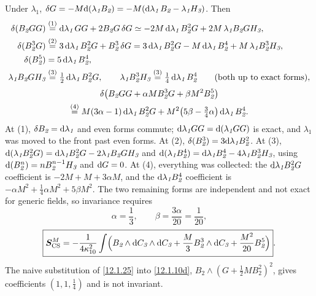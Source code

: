 \begin{tcolorbox}[breakable]
\begin{remark}
		Under $\lambda_{\textit{1}}$, $\delta G=-M\mathrm{d}(\lambda_{\textit{1}}B_{\textit{2}})=-M(\mathrm{d}\lambda_{\textit{1}}\,B_{\textit{2}}-\lambda_{\textit{1}}H_{\textit{3}})$. Then
		\begin{align*}
			\delta(B_{\textit{2}}GG)&\overset{(1)}{=} \mathrm{d}\lambda_{\textit{1}}\,GG+2B_{\textit{2}}G\,\delta G
			\simeq -2M\,\mathrm{d}\lambda_{\textit{1}}\,B_{\textit{2}}^{2}G+2M\,\lambda_{\textit{1}}B_{\textit{2}}GH_{\textit{3}},\\
			\delta(B_{\textit{2}}^{3}G)&\overset{(2)}{=} 3\,\mathrm{d}\lambda_{\textit{1}}\,B_{\textit{2}}^{2}G+B_{\textit{2}}^{3}\,\delta G
			=3\,\mathrm{d}\lambda_{\textit{1}}\,B_{\textit{2}}^{2}G-M\,\mathrm{d}\lambda_{\textit{1}}\,B_{\textit{2}}^{4}+M\,\lambda_{\textit{1}}B_{\textit{2}}^{3}H_{\textit{3}},\\
			\delta(B_{\textit{2}}^{5})&=5\,\mathrm{d}\lambda_{\textit{1}}\,B_{\textit{2}}^{4},\\
			\lambda_{\textit{1}}B_{\textit{2}}GH_{\textit{3}}&\overset{(3)}{=}\tfrac12\,\mathrm{d}\lambda_{\textit{1}}\,B_{\textit{2}}^{2}G,\qquad
			\lambda_{\textit{1}}B_{\textit{2}}^{3}H_{\textit{3}}\overset{(3)}{=}\tfrac14\,\mathrm{d}\lambda_{\textit{1}}\,B_{\textit{2}}^{4}\qquad(\text{both up to exact forms}),
		\end{align*}
		\begin{multline*}
			\delta\bigl(B_{\textit{2}}GG+\alpha MB_{\textit{2}}^{3}G+\beta M^{2}B_{\textit{2}}^{5}\bigr)\\
			\overset{(4)}{=} M(3\alpha-1)\,\mathrm{d}\lambda_{\textit{1}}\,B_{\textit{2}}^{2}G+M^{2}\bigl(5\beta-\tfrac34\alpha\bigr)\,\mathrm{d}\lambda_{\textit{1}}\,B_{\textit{2}}^{4} .
		\end{multline*}
		At (1), $\delta B_{\textit{2}}=\mathrm{d}\lambda_{\textit{1}}$ and even forms commute; $\mathrm{d}\lambda_{\textit{1}}GG=\mathrm{d}(\lambda_{\textit{1}}GG)$ is exact, and $\lambda_{\textit{1}}$ was moved to the front past even forms. At (2), $\delta(B_{\textit{2}}^{3})=3\mathrm{d}\lambda_{\textit{1}}B_{\textit{2}}^{2}$. At (3), $\mathrm{d}(\lambda_{\textit{1}}B_{\textit{2}}^{2}G)=\mathrm{d}\lambda_{\textit{1}}B_{\textit{2}}^{2}G-2\lambda_{\textit{1}}B_{\textit{2}}GH_{\textit{3}}$ and $\mathrm{d}(\lambda_{\textit{1}}B_{\textit{2}}^{4})=\mathrm{d}\lambda_{\textit{1}}B_{\textit{2}}^{4}-4\lambda_{\textit{1}}B_{\textit{2}}^{3}H_{\textit{3}}$, using $\mathrm{d}(B_{\textit{2}}^{n})=nB_{\textit{2}}^{n-1}H_{\textit{3}}$ and $\mathrm{d} G=0$. At (4), everything was collected: the $\mathrm{d}\lambda_{\textit{1}}B^{2}_{\textit{2}}G$ coefficient is $-2M+M+3\alpha M$, and the $\mathrm{d}\lambda_{\textit{1}}B^{4}_{\textit{2}}$ coefficient is $-\alpha M^{2}+\frac14\alpha M^{2}+5\beta M^{2}$. The two remaining forms are independent and not exact for generic fields, so invariance requires
		\[
		\alpha=\frac13,\qquad \beta=\frac{3\alpha}{20}=\frac{1}{20},
		\]
		\[
		\boxed{\bm S^{M}_{\text{CS}}=-\frac{1}{4\kappa_{10}^{2}}\int\Bigl(B_{\textit{2}}\wedge\mathrm{d} C_{\textit{3}}\wedge\mathrm{d} C_{\textit{3}}+\frac{M}{3}B_{\textit{2}}^{3}\wedge\mathrm{d} C_{\textit{3}}+\frac{M^{2}}{20}B_{\textit{2}}^{5}\Bigr)} .
		\]
		The naive substitution of \eqref{12.1.25} into \eqref{12.1.10d}, $B_{\textit{2}}\wedge(G+\frac12MB_{\textit{2}}^{2})^{2}$, gives coefficients $(1,1,\frac14)$ and is not invariant.


\end{remark}
\end{tcolorbox}
